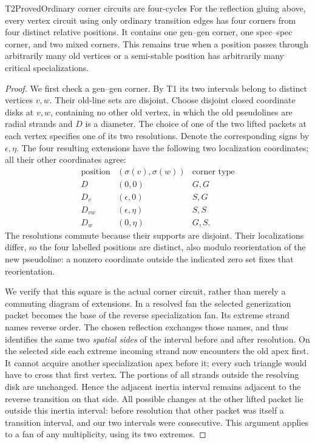 \begin{resultenv}{T2}{Proved}{Ordinary corner circuits are four-cycles}
For the reflection gluing above, every vertex circuit using only
ordinary transition edges has four corners from four distinct relative
positions. It contains one gen--gen corner, one spec--spec corner, and
two mixed corners. This remains true when a position passes through
arbitrarily many old vertices or a semi-stable position has arbitrarily
many critical specializations.
\end{resultenv}
\begin{proof}
We first check a gen--gen corner. By T1 its two intervals belong to
distinct vertices $v,w$. Their old-line sets are disjoint. Choose
disjoint closed coordinate disks at $v,w$, containing no other old
vertex, in which the old pseudolines are radial strands and $D$ is a
diameter. The choice of one of the two lifted packets at each vertex
specifies one of its two resolutions. Denote the corresponding signs
by $\epsilon,\eta$. The four resulting extensions have the following
two localization coordinates; all their other coordinates agree:
\[
\begin{array}{c|c|c}
\text{position}&(\sigma(v),\sigma(w))&\text{corner type}\\\hline
D&(0,0)&G,G\\
D_v&(\epsilon,0)&S,G\\
D_{vw}&(\epsilon,\eta)&S,S\\
D_w&(0,\eta)&G,S.
\end{array}
\]
The resolutions commute because their supports are disjoint. Their
localizations differ, so the four labelled positions are distinct,
also modulo reorientation of the new pseudoline: a nonzero coordinate
outside the indicated zero set fixes that reorientation.

We verify that this square is the actual corner circuit, rather than
merely a commuting diagram of extensions. In a resolved fan the selected
generization packet becomes the base of the reverse specialization
fan. Its extreme strand names reverse order. The chosen reflection
exchanges those names, and thus identifies the same two \emph{spatial
sides} of the interval before and after resolution. On the selected
side each extreme incoming strand now encounters the old apex first.
It cannot acquire another specialization apex before it; every such
triangle would have to cross that first vertex. The portions of all
strands outside the resolving disk are unchanged. Hence the adjacent
inertia interval remains adjacent to the reverse transition on that
side. All possible changes at the other lifted packet lie outside
this inertia interval: before resolution that other packet was itself
a transition interval, and our two intervals were consecutive. This
argument applies to a fan of any multiplicity, using its two extremes.


\end{proof}
